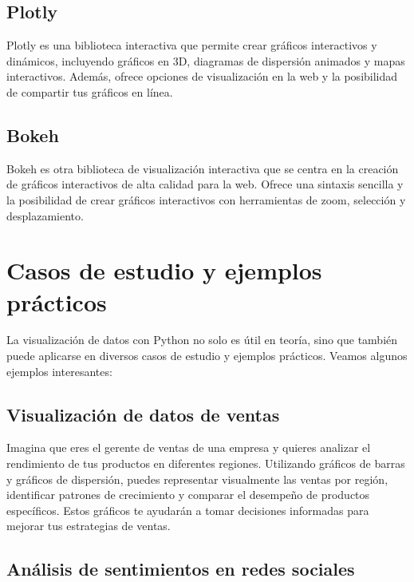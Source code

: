 \documentclass[
  a4paper,
]{article}
\begin{document}
\hypertarget{plotly}{%
\subsection{Plotly}\label{plotly}}

Plotly es una biblioteca interactiva que permite crear gráficos
interactivos y dinámicos, incluyendo gráficos en 3D, diagramas de
dispersión animados y mapas interactivos. Además, ofrece opciones de
visualización en la web y la posibilidad de compartir tus gráficos en
línea.

\hypertarget{bokeh-1}{%
\subsection{Bokeh}\label{bokeh-1}}

Bokeh es otra biblioteca de visualización interactiva que se centra en
la creación de gráficos interactivos de alta calidad para la web. Ofrece
una sintaxis sencilla y la posibilidad de crear gráficos interactivos
con herramientas de zoom, selección y desplazamiento.

\hypertarget{casos-de-estudio-y-ejemplos-pruxe1cticos}{%
\section{Casos de estudio y ejemplos
prácticos}\label{casos-de-estudio-y-ejemplos-pruxe1cticos}}

La visualización de datos con Python no solo es útil en teoría, sino que
también puede aplicarse en diversos casos de estudio y ejemplos
prácticos. Veamos algunos ejemplos interesantes:

\hypertarget{visualizaciuxf3n-de-datos-de-ventas}{%
\subsection{Visualización de datos de
ventas}\label{visualizaciuxf3n-de-datos-de-ventas}}

Imagina que eres el gerente de ventas de una empresa y quieres analizar
el rendimiento de tus productos en diferentes regiones. Utilizando
gráficos de barras y gráficos de dispersión, puedes representar
visualmente las ventas por región, identificar patrones de crecimiento y
comparar el desempeño de productos específicos. Estos gráficos te
ayudarán a tomar decisiones informadas para mejorar tus estrategias de
ventas.

\hypertarget{anuxe1lisis-de-sentimientos-en-redes-sociales}{%
\subsection{Análisis de sentimientos en redes
sociales}\label{anuxe1lisis-de-sentimientos-en-redes-sociales}}
\end{document}
